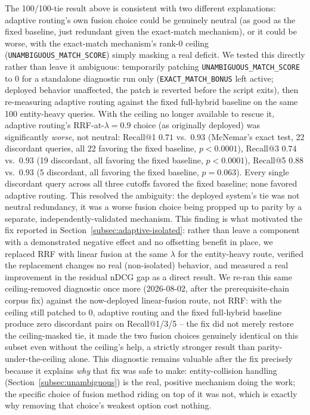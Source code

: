 \documentclass[a4paper,twoside]{article}
\begin{document}
The 100/100-tie result above is consistent with two different explanations: adaptive routing's own fusion choice could be genuinely neutral (as good as the fixed baseline, just redundant given the exact-match mechanism), or it could be worse, with the exact-match mechanism's rank-0 ceiling (\texttt{UNAMBIGUOUS\_MATCH\_SCORE}) simply masking a real deficit. We tested this directly rather than leave it ambiguous: temporarily patching \texttt{UNAMBIGUOUS\_MATCH\_SCORE} to 0 for a standalone diagnostic run only (\texttt{EXACT\_MATCH\_BONUS} left active; deployed behavior unaffected, the patch is reverted before the script exits), then re-measuring adaptive routing against the fixed full-hybrid baseline on the same 100 entity-heavy queries. With the ceiling no longer available to rescue it, adaptive routing's RRF-at-$\lambda{=}0.9$ choice (as originally deployed) was significantly \emph{worse}, not neutral: Recall@1 $0.71$ vs.\ $0.93$ (McNemar's exact test, 22 discordant queries, all 22 favoring the fixed baseline, $p<0.0001$), Recall@3 $0.74$ vs.\ $0.93$ (19 discordant, all favoring the fixed baseline, $p<0.0001$), Recall@5 $0.88$ vs.\ $0.93$ (5 discordant, all favoring the fixed baseline, $p=0.063$). Every single discordant query across all three cutoffs favored the fixed baseline; none favored adaptive routing. This resolved the ambiguity: the deployed system's tie was not neutral redundancy, it was a worse fusion choice being propped up to parity by a separate, independently-validated mechanism. This finding is what motivated the fix reported in Section~\ref{subsec:adaptive-isolated}: rather than leave a component with a demonstrated negative effect and no offsetting benefit in place, we replaced RRF with linear fusion at the same $\lambda$ for the entity-heavy route, verified the replacement changes no real (non-isolated) behavior, and measured a real improvement in the residual nDCG gap as a direct result. We re-ran this same ceiling-removed diagnostic once more (2026-08-02, after the prerequisite-chain corpus fix) against the now-deployed linear-fusion route, not RRF: with the ceiling still patched to 0, adaptive routing and the fixed full-hybrid baseline produce zero discordant pairs on Recall@1/3/5 -- the fix did not merely restore the ceiling-masked tie, it made the two fusion choices genuinely identical on this subset even without the ceiling's help, a strictly stronger result than parity-under-the-ceiling alone. This diagnostic remains valuable after the fix precisely because it explains \emph{why} that fix was safe to make: entity-collision handling (Section~\ref{subsec:unambiguous}) is the real, positive mechanism doing the work; the specific choice of fusion method riding on top of it was not, which is exactly why removing that choice's weakest option cost nothing.
\end{document}

